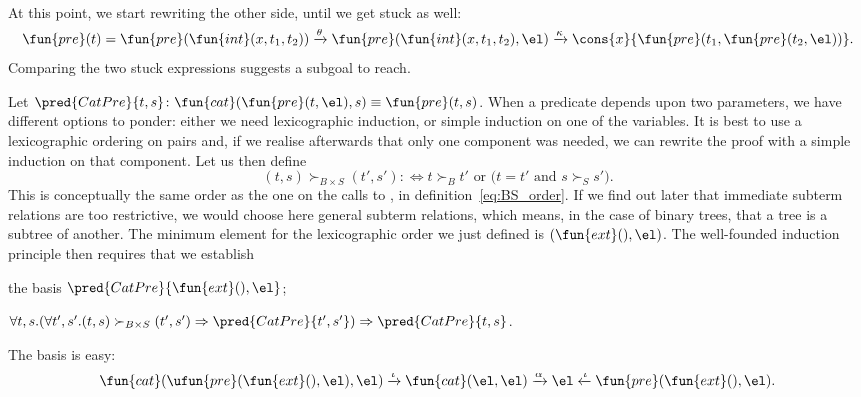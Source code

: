 At this point, we start rewriting the other side, until we get stuck
as well:
\begin{equation*}
  \fun{pre}(t) = \fun{pre}(\fun{int}(x,t_1,t_2))
\xrightarrow{\smash{\theta}} \fun{pre}(\fun{int}(x,t_1,t_2),\el)
\xrightarrow{\smash{\kappa}}
\cons{x}{\fun{pre}(t_1,\fun{pre}(t_2,\el))}.
\index{pre@\fun{pre/1}}
\index{pre@\fun{pre/2}}
\end{equation*}
Comparing the two stuck expressions suggests a subgoal to reach.

Let \(\pred{CatPre}{t,s} \colon \fun{cat}(\fun{pre}(t,\el),s) \equiv
\fun{pre}(t,s)\). When
a predicate depends upon two parameters, we have different options to
ponder: either we need lexicographic induction, or simple induction on
one of the variables. It is best to use a lexicographic
ordering on pairs and, if we
realise afterwards that only one component was needed, we can rewrite
the proof with a simple induction on that component. Let us then
define
\begin{equation*}
(t,s) \succ_{B \times S} (t',s') :\Leftrightarrow \text{\(t \succ_{B}
    t'\) or (\(t = t'\) and \(s \succ_{S} s'\))}.
\end{equation*}
This is conceptually the same order as the one on the calls to
, in
definition~\eqref{eq:BS_order}. If we find out later that immediate
subterm relations are too restrictive, we would choose here general
subterm relations, which means, in the case of binary trees, that a
tree is a subtree of another. The minimum element for the
lexicographic order we just defined is \((\fun{ext}(),\el)\). The
well\hyp{}founded induction principle then requires that we establish
\begin{itemize*}

  \item the basis \(\pred{CatPre}{\fun{ext}(),\el}\);

  \item \(\forall t,s. (\forall t',s'.(t,s) \succ_{B \times S} (t',s')
    \Rightarrow \pred{CatPre}{t',s'}) \Rightarrow
    \pred{CatPre}{t,s}\).

\end{itemize*}
The basis is easy:
\begin{equation*}
  \fun{cat}(\ufun{pre}(\fun{ext}(),\el),\el)
  \xrightarrow{\smash{\iota}} \fun{cat}(\el,\el)
  \xrightarrow{\smash{\alpha}} \el \xleftarrow{\smash{\iota}}
  \fun{pre}(\fun{ext}(),\el).
\index{cat@\fun{cat/2}}
\end{equation*}

